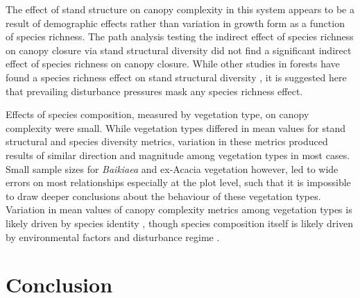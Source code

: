 \documentclass[11pt,a4paper]{article}
\begin{document}
The effect of stand structure on canopy complexity in this system appears to be a result of demographic effects rather than variation in growth form as a function of species richness. The path analysis testing the indirect effect of species richness on canopy closure via stand structural diversity did not find a significant indirect effect of species richness on canopy closure. While other studies in forests have found a species richness effect on stand structural diversity \citep{}, it is suggested here that prevailing disturbance pressures mask any species richness effect.

Effects of species composition, measured by vegetation type, on canopy complexity were small. While vegetation types differed in mean values for stand structural and species diversity metrics, variation in these metrics produced results of similar direction and magnitude among vegetation types in most cases. Small sample sizes for \textit{Baikiaea} and ex-Acacia vegetation however, led to wide errors on most relationships especially at the plot level, such that it is impossible to draw deeper conclusions about the behaviour of these vegetation types. Variation in mean values of canopy complexity metrics among vegetation types is likely driven by species identity \citep{}, though species composition itself is likely driven by environmental factors and disturbance regime \citep{}. 


\section{Conclusion}

\printbibliography



\end{document}
